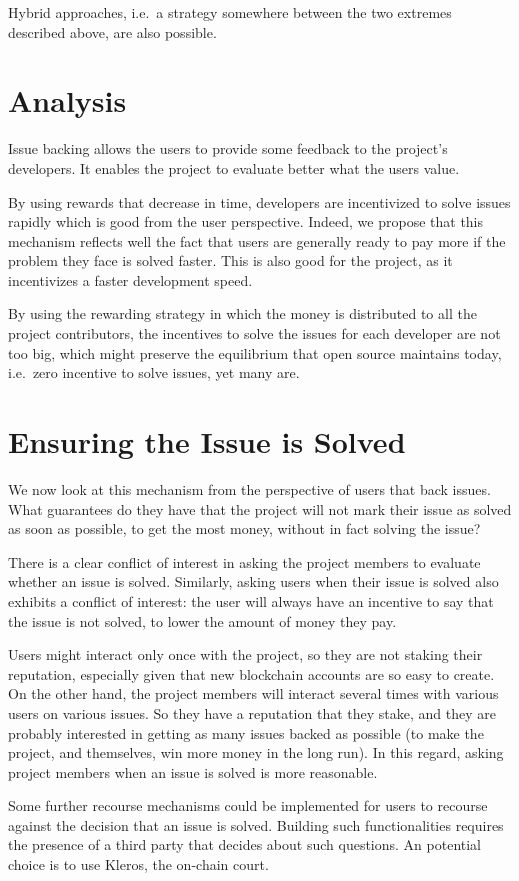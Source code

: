 Hybrid approaches, i.e.\ a strategy somewhere between the two extremes described above, are also possible.

\section{Analysis}

Issue backing allows the users to provide some feedback to the project's developers.
It enables the project to evaluate better what the users value.

By using rewards that decrease in time, developers are incentivized to solve issues rapidly which is good from the user perspective.
Indeed, we propose that this mechanism reflects well the fact that users are generally ready to pay more if the problem they face is solved faster.
This is also good for the project, as it incentivizes a faster development speed.

By using the rewarding strategy in which the money is distributed to all the project contributors, the incentives to solve the issues for each developer are not too big, which might preserve the equilibrium that open source maintains today, i.e.\ zero incentive to solve issues, yet many are.

\section{Ensuring the Issue is Solved}

We now look at this mechanism from the perspective of users that back issues.
What guarantees do they have that the project will not mark their issue as solved as soon as possible, to get the most money, without in fact solving the issue?

There is a clear conflict of interest in asking the project members to evaluate whether an issue is solved.
Similarly, asking users when their issue is solved also exhibits a conflict of interest: the user will always have an incentive to say that the issue is not solved, to lower the amount of money they pay.

Users might interact only once with the project, so they are not staking their reputation, especially given that new blockchain accounts are so easy to create.
On the other hand, the project members will interact several times with various users on various issues.
So they have a reputation that they stake, and they are probably interested in getting as many issues backed as possible (to make the project, and themselves, win more money in the long run).
In this regard, asking project members when an issue is solved is more reasonable.

Some further recourse mechanisms could be implemented for users to recourse against the decision that an issue is solved.
Building such functionalities requires the presence of a third party that decides about such questions.
An potential choice is to use Kleros, the on-chain court.
